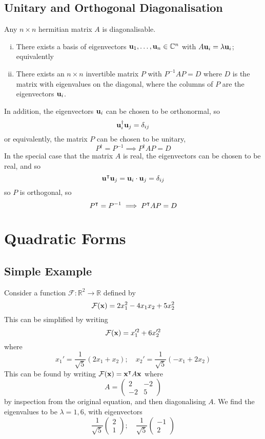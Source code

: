 \documentclass{article}
\begin{document}
\subsection{Unitary and Orthogonal Diagonalisation}
\begin{theorem}
    Any $n\times n$ hermitian matrix $A$ is diagonalisable.
    \begin{enumerate}[(i)]
        \item There exists a basis of eigenvectors $\vb u_1, \dots, \vb u_n \in \mathbb C^n$ with $A\vb u_i = \lambda \vb u_i$; equivalently
        \item There exists an $n \times n$ invertible matrix $P$ with $P^{-1}AP = D$ where $D$ is the matrix with eigenvalues on the diagonal, where the columns of $P$ are the eigenvectors $\vb u_i$.
    \end{enumerate}
    In addition, the eigenvectors $\vb u_i$ can be chosen to be orthonormal, so
    \[ \vb u^\dagger_i \vb u_j = \delta_{ij} \]
    or equivalently, the matrix $P$ can be chosen to be unitary,
    \[ P^\dagger = P^{-1} \implies P^\dagger AP = D \]
    In the special case that the matrix $A$ is real, the eigenvectors can be chosen to be real, and so
    \[ \vb u^\intercal \vb u_j = \vb u_i \cdot \vb u_j = \delta_{ij} \]
    so $P$ is orthogonal, so
    \[ P^\intercal = P^{-1} \implies P^\intercal AP = D \]
\end{theorem}

\section{Quadratic Forms}
\subsection{Simple Example}
Consider a function $\mathcal F\colon \mathbb R^2 \to \mathbb R$ defined by
\[ \mathcal F(\vb x) = 2x_1^2 - 4x_1x_2 + 5x_2^2 \]
This can be simplified by writing
\[ \mathcal F(\vb x) = x_1'^2 + 6x_2'^2 \]
where
\[ x_1' = \frac{1}{\sqrt 5}(2x_1 + x_2);\quad x_2' = \frac{1}{\sqrt 5}(-x_1 + 2x_2) \]
This can be found by writing $\mathcal F(\vb x) = \vb x^\intercal A\vb x$ where
\[ A = \begin{pmatrix}
        2 & -2 \\ -2 & 5
    \end{pmatrix} \]
by inspection from the original equation, and then diagonalising $A$. We find the eigenvalues to be $\lambda = 1, 6$, with eigenvectors
\[ \frac{1}{\sqrt 5} \begin{pmatrix}
        2 \\ 1
    \end{pmatrix};\quad \frac{1}{\sqrt 5}\begin{pmatrix}
        -1 \\ 2
    \end{pmatrix} \]
\end{document}
